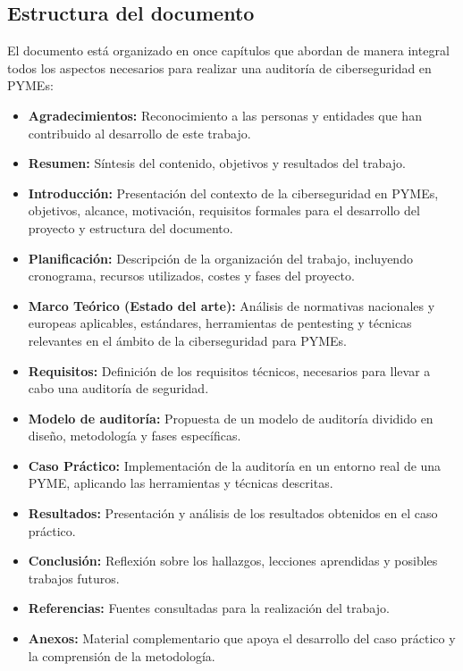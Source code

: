 \documentclass[a4paper, 10pt]{article}
\begin{document}
\subsection{Estructura del documento}

El documento está organizado en once capítulos que abordan de manera integral todos los aspectos necesarios para realizar una auditoría de ciberseguridad en PYMEs:

\begin{itemize}
    \item \textbf{Agradecimientos:} Reconocimiento a las personas y entidades que han contribuido al desarrollo de este trabajo.
    
    \item \textbf{Resumen:} Síntesis del contenido, objetivos y resultados del trabajo.
    
    \item \textbf{Introducción:} Presentación del contexto de la ciberseguridad en PYMEs, objetivos, alcance, motivación, requisitos formales para el desarrollo del proyecto y estructura del documento.
    
    \item \textbf{Planificación:} Descripción de la organización del trabajo, incluyendo cronograma, recursos utilizados, costes y fases del proyecto.
    
    \item \textbf{Marco Teórico (Estado del arte):} Análisis de normativas nacionales y europeas aplicables, estándares, herramientas de pentesting y técnicas relevantes en el ámbito de la ciberseguridad para PYMEs.
    
    \item \textbf{Requisitos:} Definición de los requisitos técnicos, necesarios para llevar a cabo una auditoría de seguridad.
    
    \item \textbf{Modelo de auditoría:} Propuesta de un modelo de auditoría dividido en diseño, metodología y fases específicas.
    
    \item \textbf{Caso Práctico:} Implementación de la auditoría en un entorno real de una PYME, aplicando las herramientas y técnicas descritas.
    
    \item \textbf{Resultados:} Presentación y análisis de los resultados obtenidos en el caso práctico.
    
    \item \textbf{Conclusión:} Reflexión sobre los hallazgos, lecciones aprendidas y posibles trabajos futuros.
    
    \item \textbf{Referencias:} Fuentes consultadas para la realización del trabajo.
    
    \item \textbf{Anexos:}  Material complementario que apoya el desarrollo del caso práctico y la comprensión de la metodología.

\end{itemize}
\end{document}
